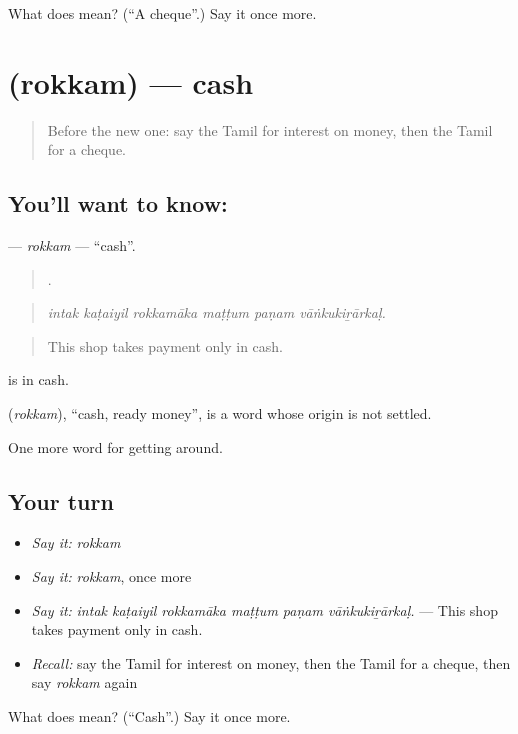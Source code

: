 \begin{tcolorbox}[breakable,colback=teal!4,colframe=teal!35!black,title={Before you move on}]
What does  mean? (\textquotedblleft{}A cheque\textquotedblright{}.) Say it once more.
\end{tcolorbox}
\section[\texorpdfstring{\ta{ரொக்கம்} (rokkam)}{ரொக்கம் (rokkam)}]{ (rokkam) — cash}

\label{lesson:TA-C446-rokkam}



\begin{quote}
Before the new one: say the Tamil for interest on money, then the Tamil for a cheque.
\end{quote}

\subsection*{You'll want to know: }
\textbf{} — \emph{rokkam} — \textquotedblleft{}cash\textquotedblright{}.

\begin{quote}
     .
\end{quote}

\begin{quote}
\emph{intak kaṭaiyil rokkamāka maṭṭum paṇam vāṅkukiṟārkaḷ.}
\end{quote}

\begin{quote}
This shop takes payment only in cash.
\end{quote}

 is in cash.

\begin{cousinweb}
\textbf{} (\emph{rokkam}), \textquotedblleft{}cash, ready money\textquotedblright{}, is a word whose origin is not settled.
\end{cousinweb}

\begin{grammarlens}[title={What you've built}]
One more word for getting around.
\end{grammarlens}

\subsection*{Your turn}
\begin{itemize}
\raggedright
  \item \emph{Say it:} \emph{rokkam}
  \item \emph{Say it:} \emph{rokkam}, once more
  \item \emph{Say it:} \emph{intak kaṭaiyil rokkamāka maṭṭum paṇam vāṅkukiṟārkaḷ.} — This shop takes payment only in cash.
  \item \emph{Recall:} say the Tamil for interest on money, then the Tamil for a cheque, then say \emph{rokkam} again
\end{itemize}

\begin{tcolorbox}[breakable,colback=teal!4,colframe=teal!35!black,title={Before you move on}]
What does  mean? (\textquotedblleft{}Cash\textquotedblright{}.) Say it once more.
\end{tcolorbox}
